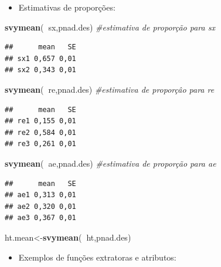 \documentclass[]{book}
\newenvironment{Shaded}{\begin{snugshade}}{\end{snugshade}}
\newcommand{\KeywordTok}[1]{\textcolor[rgb]{0.13,0.29,0.53}{\textbf{#1}}}
\newcommand{\CommentTok}[1]{\textcolor[rgb]{0.56,0.35,0.01}{\textit{#1}}}
\newcommand{\OperatorTok}[1]{\textcolor[rgb]{0.81,0.36,0.00}{\textbf{#1}}}
\newcommand{\NormalTok}[1]{#1}
\providecommand{\tightlist}{%
  \setlength{\itemsep}{0pt}\setlength{\parskip}{0pt}}
\theoremstyle{definition}
\theoremstyle{definition}
\theoremstyle{definition}
\theoremstyle{remark}
\begin{document}
\begin{itemize}
\tightlist
\item
  Estimativas de proporções:
\end{itemize}

\begin{Shaded}
\begin{Highlighting}[]
\KeywordTok{svymean}\NormalTok{(}\OperatorTok{~}\NormalTok{sx,pnad.des)         }\CommentTok{#estimativa de proporção para sx}
\end{Highlighting}
\end{Shaded}

\begin{verbatim}
##      mean   SE
## sx1 0,657 0,01
## sx2 0,343 0,01
\end{verbatim}

\begin{Shaded}
\begin{Highlighting}[]
\KeywordTok{svymean}\NormalTok{(}\OperatorTok{~}\NormalTok{re,pnad.des)         }\CommentTok{#estimativa de proporçâo para re}
\end{Highlighting}
\end{Shaded}

\begin{verbatim}
##      mean   SE
## re1 0,155 0,01
## re2 0,584 0,01
## re3 0,261 0,01
\end{verbatim}

\begin{Shaded}
\begin{Highlighting}[]
\KeywordTok{svymean}\NormalTok{(}\OperatorTok{~}\NormalTok{ae,pnad.des)         }\CommentTok{#estimativa de proporção para ae}
\end{Highlighting}
\end{Shaded}

\begin{verbatim}
##      mean   SE
## ae1 0,313 0,01
## ae2 0,320 0,01
## ae3 0,367 0,01
\end{verbatim}

\begin{Shaded}
\begin{Highlighting}[]
\NormalTok{ht.mean<-}\KeywordTok{svymean}\NormalTok{(}\OperatorTok{~}\NormalTok{ht,pnad.des)}
\end{Highlighting}
\end{Shaded}

\begin{itemize}
\tightlist
\item
  Exemplos de funções extratoras e atributos:
\end{itemize}
\end{document}
